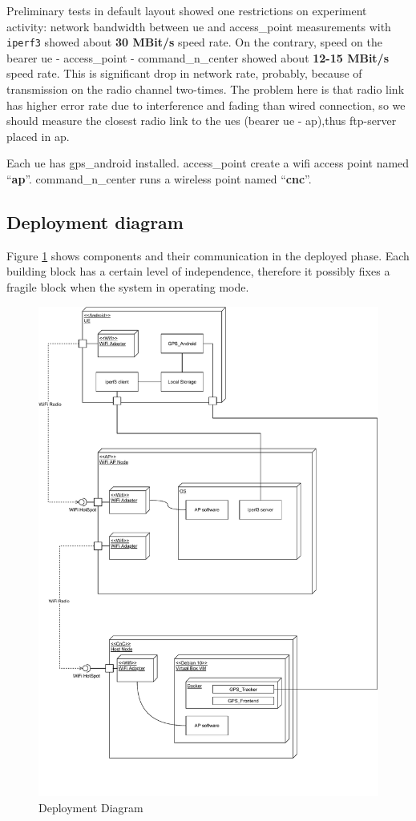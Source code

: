 Preliminary tests in default layout showed one restrictions on experiment activity: network bandwidth
between \gls{ue} and \acrshort{access_point} measurements with \texttt{iperf3} showed about \textbf{30 MBit/s} speed rate. On the contrary, speed on the bearer \gls{ue} - \acrshort{access_point} - \gls{command_n_center} showed about \textbf{12-15 MBit/s} speed rate. This is significant drop in network rate, probably, because of transmission on the radio channel two-times. The problem here is that radio link has higher error rate due to interference and fading than wired connection, so we should measure the closest radio link to the \glspl{ue} (bearer \gls{ue} - \gls{ap}),thus \acrshort{ftp}-server placed in \gls{ap}.

Each \gls{ue} has   \gls{gps_android} installed. \Gls{access_point} create a \gls{wifi} access point named ``\textbf{ap}''.
\Gls{command_n_center} runs a wireless point named
``\textbf{cnc}''.

\subsection{Deployment diagram}\label{deployment-diagram}

Figure \ref{fig:deployment-diagram} shows components and their communication in the deployed phase. Each building block has a certain level of independence, therefore it possibly fixes a fragile block when the system in operating mode.

\begin{figure}[H]
	\centering
	\includegraphics[width=0.7\linewidth, keepaspectratio]{images/Deployment Diagram-Deployment_Diagram.pdf}
	\caption{Deployment Diagram}
	\label{fig:deployment-diagram}
\end{figure}

